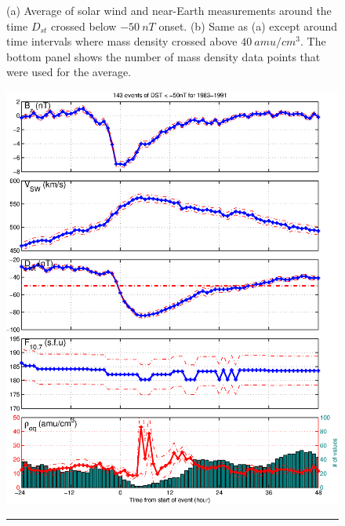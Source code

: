 \documentclass[10pt,twocolumn]{article}
\begin{document}
\begin{figure}[htp!]
\caption{(a) Average of solar wind and near-Earth measurements around the time $D_{st}$ crossed below $-50~nT$ onset. (b) Same as (a) except around time intervals where mass density crossed above $40~amu/cm^3$.  The bottom panel shows the number of mass density data points that were used for the average.}
\label{Storms}
\end{figure}

\begin{figure}[htp!]
\centering
\includegraphics[scale=0.45]{paperfigures/stormavs-dd12.eps}
\rule[1ex]{5cm}{0.5pt}

\end{figure}
\end{document}
